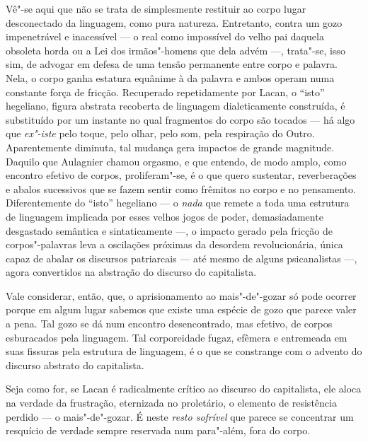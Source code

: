 Vê"-se aqui que não se trata de simplesmente restituir ao corpo lugar
desconectado da linguagem, como pura natureza. Entretanto, contra um
gozo impenetrável e inacessível --- o real como impossível do velho pai
daquela obsoleta horda ou a Lei dos irmãos"-homens que dela advém ---,
trata"-se, isso sim, de advogar em defesa de uma tensão permanente entre
corpo e palavra. Nela, o corpo ganha estatura equânime à da palavra e
ambos operam numa constante força de fricção. Recuperado repetidamente
por Lacan, o ``isto'' hegeliano, figura abstrata recoberta de linguagem
dialeticamente construída, é substituído por um instante no qual
fragmentos do corpo são tocados --- há algo que \emph{ex"-iste} pelo
toque, pelo olhar, pelo som, pela respiração do Outro. Aparentemente
diminuta, tal mudança gera impactos de grande magnitude. Daquilo que
Aulagnier chamou orgasmo, e que entendo, de modo amplo, como encontro
efetivo de corpos, proliferam"-se, é o que quero sustentar, reverberações
e abalos sucessivos que se fazem sentir como frêmitos no corpo e no
pensamento. Diferentemente do ``isto'' hegeliano --- o \emph{nada} que
remete a toda uma estrutura de linguagem implicada por esses velhos
jogos de poder, demasiadamente desgastado semântica e sintaticamente ---,
o impacto gerado pela fricção de corpos"-palavras leva a oscilações
próximas da desordem revolucionária, única capaz de abalar os discursos
patriarcais --- até mesmo de alguns psicanalistas ---, agora convertidos
na abstração do discurso do capitalista.

\asterisc

Vale considerar, então, que, o aprisionamento ao mais"-de"-gozar só pode
ocorrer porque em algum lugar sabemos que existe uma espécie de gozo que
parece valer a pena. Tal gozo se dá num encontro desencontrado, mas
efetivo, de corpos esburacados pela linguagem. Tal corporeidade fugaz,
efêmera e entremeada em suas fissuras pela estrutura de linguagem, é o
que se constrange com o advento do discurso abstrato do capitalista.

Seja como for, se Lacan é radicalmente crítico ao discurso do
capitalista, ele aloca na verdade da frustração, eternizada no
proletário, o elemento de resistência perdido --- o mais"-de"-gozar. É
neste \emph{resto sofrível} que parece se concentrar um resquício de
verdade sempre reservada num para"-além, fora do corpo.

